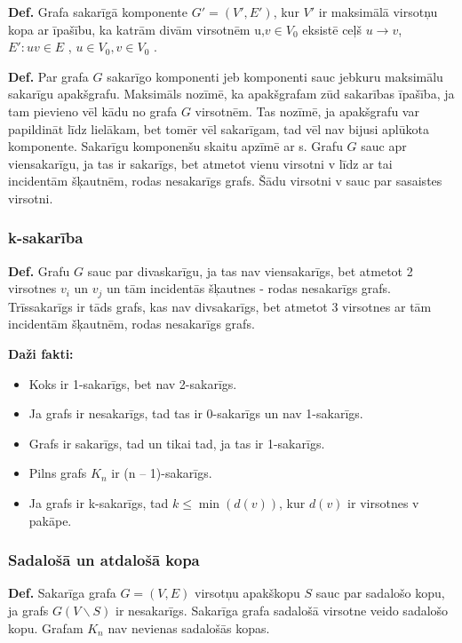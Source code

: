 \documentclass{article}
\begin{document}
\textbf{Def.}  Grafa sakarīgā komponente $G'=(V',E')$, kur $V'$ ir maksimālā virsotņu kopa ar īpašību, ka katrām divām virsotnēm u,$v \in V_0$ eksistē ceļš $ u → v$, $E':uv \in E$ , $u \in V_0 , v \in V_0$ . 

\textbf{Def.}  Par grafa $ G $ sakarīgo komponenti jeb komponenti sauc jebkuru maksimālu sakarīgu apakšgrafu.
Maksimāls nozīmē, ka apakšgrafam zūd sakarības īpašība, ja tam pievieno vēl kādu no grafa $ G $ virsotnēm. Tas nozīmē, ja apakšgrafu var papildināt līdz lielākam, bet tomēr vēl sakarīgam, tad vēl nav bijusi aplūkota komponente.  Sakarīgu komponenšu skaitu apzīmē ar s.  Grafu $ G $ sauc apr viensakarīgu, ja tas ir sakarīgs, bet atmetot vienu virsotni v līdz ar tai incidentām šķautnēm, rodas nesakarīgs grafs. Šādu virsotni v sauc par sasaistes virsotni.

\subsubsection{k-sakarība}

\textbf{Def.} Grafu $ G $ sauc par divaskarīgu, ja tas nav viensakarīgs, bet atmetot 2 virsotnes $v_i$ un $v_j$ un tām incidentās šķautnes - rodas nesakarīgs grafs. Trīssakarīgs ir tāds grafs, kas nav divsakarīgs, bet atmetot 3 virsotnes ar tām incidentām šķautnēm, rodas nesakarīgs grafs.

\textbf{Daži fakti:}
\begin{itemize}
	\item Koks ir 1-sakarīgs, bet nav 2-sakarīgs.
	\item Ja grafs ir nesakarīgs, tad tas ir 0-sakarīgs un nav 1-sakarīgs.
	\item Grafs ir sakarīgs, tad un tikai tad, ja tas ir 1-sakarīgs.
	\item Pilns grafs $K_n$ ir (n – 1)-sakarīgs.
	\item Ja grafs ir k-sakarīgs, tad $k \le \min(d(v))$, kur $d(v)$ ir virsotnes v pakāpe.
\end{itemize}

\subsubsection{Sadalošā un atdalošā kopa}

\textbf{Def.}  Sakarīga grafa $G = (V, E)$ virsotņu apakškopu $S$ sauc par sadalošo kopu, ja grafs $G(V \backslash S)$ ir nesakarīgs.
Sakarīga grafa sadalošā virsotne veido sadalošo kopu.  Grafam $K_n$ nav nevienas sadalošās kopas.
\end{document}
